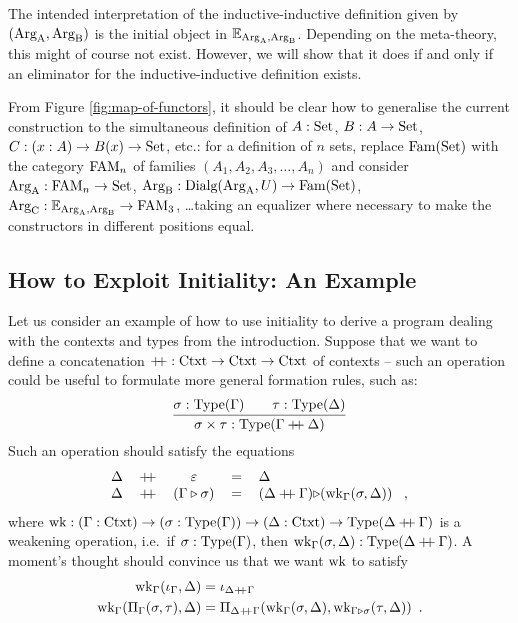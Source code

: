 \documentclass[orivec,envcountsame, ,envcountsect]{llncs}
\begin{document}
\begin{remark}
  The intended interpretation of the inductive-inductive definition
  given by $(\text{Arg}_{\text{A}}, \text{Arg}_{\text{B}})$ is the initial object in
  $\mathbb{E}_{\text{Arg}_{\text{A}}, \text{Arg}_{\text{B}}}$. Depending on the meta-theory, this might of
  course not exist. However, we will show that it does if and only if
  an eliminator for the inductive-inductive definition exists.
\end{remark}

\begin{remark} %
  From Figure \ref{fig:map-of-functors}, it should be clear how to
  generalise the current construction to the simultaneous definition
  of $A : \text{Set}$, $B : A \to \text{Set}$, $C : {(x : A)} \to B(x) \to \text{Set}$,
  etc.: for a definition of $n$ sets, replace $\text{Fam}(\text{Set})$ with the category $\text{FAM}_n$ of families $(A_1, A_2, A_3, \ldots, A_n)$ and
  consider $\text{Arg}_{\text{A}} : \text{FAM}_n \to \text{Set}$, $\text{Arg}_{\text{B}} : \text{Dialg}(\text{Arg}_{\text{A}}, U) \to
  \text{Fam}(\text{Set})$, $\text{Arg}_{\text{C}} : \mathbb{E}_{\text{Arg}_{\text{A}}, \text{Arg}_{\text{B}}} \to \text{FAM}_3$, \ldots taking an
  equalizer where necessary to make the constructors in different
  positions equal.
\end{remark}

\subsection{How to Exploit Initiality: An Example}
\label{sec:exploit-init}

Let us consider an example of how to use initiality to
derive a program dealing with the contexts and types from the introduction.
Suppose that we want to define a concatenation $\mathbin{+\mkern-6mu+} : \text{Ctxt}
\to \text{Ctxt} \to \text{Ctxt}$ of contexts -- such an operation could be useful
to formulate more general
formation rules, such as:
\[
\infer{\sigma \times \tau : \Type(\Gamma \concatCtxt \Delta)}{\sigma : \Type(\Gamma) \quad & \tau : \Type(\Delta)}
\]
Such an operation should satisfy the equations
\[
\begin{tabular}{lcccl}
  $\Delta$ & $\concatCtxt$ & $\emptyCtxt$ & $=$ & $\Delta$ \\
  $\Delta$ & $\concatCtxt$ & $(\consCtxt{\Gamma}{\sigma})$ & $=$ & $\consCtxt{(\Delta \concatCtxt \Gamma)}{$(\wkapp{\Gamma}{\Delta}{\sigma})$}$ \enspace ,
\end{tabular}
\]
where $\text{wk} : (\Gamma : \text{Ctxt}) \to (\sigma : \text{Type}(\Gamma)) \to (\Delta
: \text{Ctxt}) \to \text{Type}(\Delta \mathbin{+\mkern-6mu+} \Gamma)$ is a weakening
operation, i.e.\ if $\sigma : \text{Type}(\Gamma)$, then
$\text{wk}_{\Gamma}(\sigma, \Delta) : \text{Type}(\Delta \mathbin{+\mkern-6mu+} \Gamma)$. A
moment's thought should convince us that we want $\text{wk}$ to satisfy
\begin{align*}
  \text{wk}_{\Gamma}(\iota_{\Gamma}, \Delta) &= \iota_{\Delta \mathbin{+\mkern-6mu+} \Gamma} \\
  \text{wk}_{\Gamma}(\Pi_{\Gamma}(\sigma, \tau), \Delta) &= \Pi_{\Delta \mathbin{+\mkern-6mu+} \Gamma}(\text{wk}_{\Gamma}(\sigma, \Delta), \text{wk}_{\Gamma \triangleright \sigma}(\tau, \Delta)) \enspace .
\end{align*}
\end{document}
